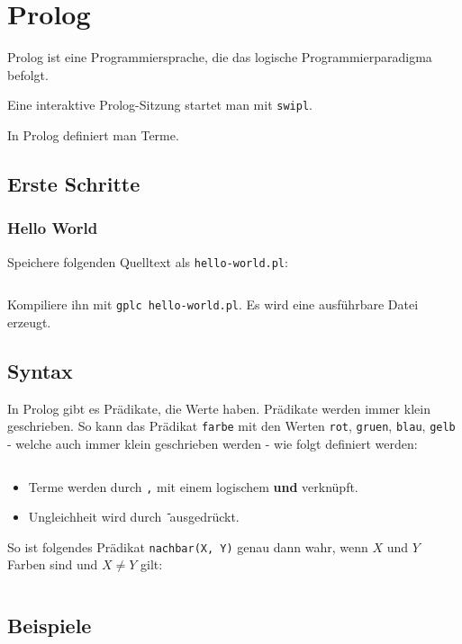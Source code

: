 \chapter{Prolog}

Prolog ist eine Programmiersprache, die das logische Programmierparadigma
befolgt.

Eine interaktive Prolog-Sitzung startet man mit \texttt{swipl}.

In Prolog definiert man Terme.
\section{Erste Schritte}
\subsection{Hello World}
Speichere folgenden Quelltext als \texttt{hello-world.pl}:
\inputminted[linenos, numbersep=5pt, tabsize=4, frame=lines, label=hello-world.hs]{prolog}{scripts/prolog/hello-world.pl}

Kompiliere ihn mit \texttt{gplc hello-world.pl}. Es wird eine
ausführbare Datei erzeugt.

\section{Syntax}
In Prolog gibt es Prädikate, die Werte haben. Prädikate werden immer klein geschrieben.
So kann das Prädikat \texttt{farbe} mit den Werten \texttt{rot}, \texttt{gruen},
\texttt{blau}, \texttt{gelb} - welche auch immer klein geschrieben werden - wie 
folgt definiert werden:

\inputminted[numbersep=5pt, tabsize=4]{prolog}{scripts/prolog/praedikat-farbe.pl}

\begin{itemize}
    \item Terme werden durch \texttt{,} mit einem logischem \textbf{und} verknüpft.
    \item Ungleichheit wird durch \texttt{\=} ausgedrückt.
\end{itemize}

So ist folgendes Prädikat \texttt{nachbar(X, Y)} genau dann wahr, wenn $X$
und $Y$ Farben sind und $X \neq Y$ gilt:

\inputminted[numbersep=5pt, tabsize=4]{prolog}{scripts/prolog/simple-term.pl}


\section{Beispiele}
